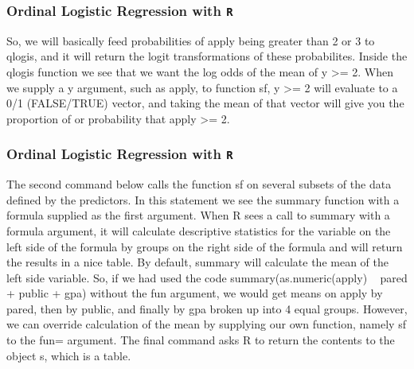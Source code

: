\begin{frame}[fragile]

\frametitle{Ordinal Logistic Regression with \texttt{R}}
\Large
So, we will basically feed probabilities of apply being greater than 2 or 3 to qlogis, and it will return the logit transformations of these probabilites. Inside the qlogis function we see that we want the log odds of the mean of y >= 2. When we supply a y argument, such as apply, to function sf, y >= 2 will evaluate to a 0/1 (FALSE/TRUE) vector, and taking the mean of that vector will give you the proportion of or probability that apply >= 2.
\end{frame}
\begin{frame}[fragile]

\frametitle{Ordinal Logistic Regression with \texttt{R}}
\Large
The second command below calls the function sf on several subsets of the data defined by the predictors. In this statement we see the summary function with a formula supplied as the first argument. When R sees a call to summary with a formula argument, it will calculate descriptive statistics for the variable on the left side of the formula by groups on the right side of the formula and will return the results in a nice table. By default, summary will calculate the mean of the left side variable. So, if we had used the code summary(as.numeric(apply) ~ pared + public + gpa) without the fun argument, we would get means on apply by pared, then by public, and finally by gpa broken up into 4 equal groups. However, we can override calculation of the mean by supplying our own function, namely sf to the fun= argument. The final command asks R to return the contents to the object s, which is a table.
\end{frame}

